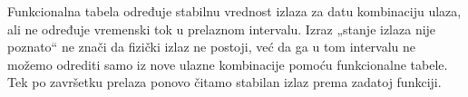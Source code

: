 Funkcionalna tabela određuje stabilnu vrednost izlaza za datu kombinaciju ulaza, ali ne određuje vremenski tok u prelaznom intervalu. Izraz „stanje izlaza nije poznato“ ne znači da fizički izlaz ne postoji, već da ga u tom intervalu ne možemo odrediti samo iz nove ulazne kombinacije pomoću funkcionalne tabele. Tek po završetku prelaza ponovo čitamo stabilan izlaz prema zadatoj funkciji.
